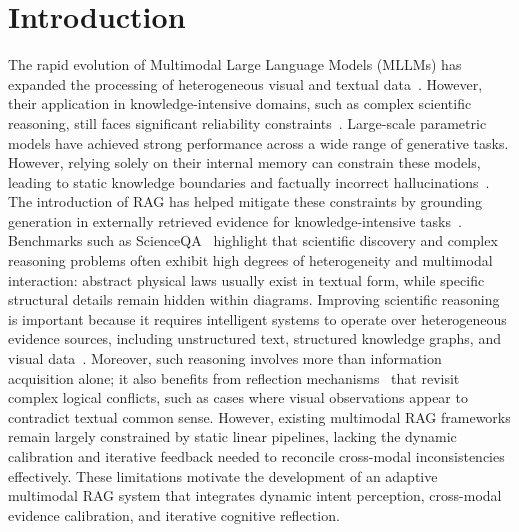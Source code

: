 \documentclass[a4paper, fleqn]{cas-dc}
\begin{document}
\maketitle

\section{Introduction}\label{sec:introduction}

The rapid evolution of Multimodal Large Language Models (MLLMs) has expanded the processing of heterogeneous visual and textual data~\cite{yin2024survey}.
However, their application in knowledge-intensive domains, such as complex scientific reasoning, still faces significant reliability constraints~\cite{alampara2025probing}.
Large-scale parametric models have achieved strong performance across a wide range of generative tasks. However, relying solely on their internal memory can constrain these models, leading to static knowledge boundaries and factually incorrect hallucinations~\cite{Lewis2020, Ji2023}.
The introduction of RAG has helped mitigate these constraints by grounding generation in externally retrieved evidence for knowledge-intensive tasks~\cite{Lewis2020, Guu2020, Gao2023}.
Benchmarks such as ScienceQA~\cite{Lu2022} highlight that scientific discovery and complex reasoning problems often exhibit high degrees of heterogeneity and multimodal interaction: abstract physical laws usually exist in textual form, while specific structural details remain hidden within diagrams.
Improving scientific reasoning is important because it requires intelligent systems to operate over heterogeneous evidence sources, including unstructured text, structured knowledge graphs, and visual data~\cite{Liu2025}.
Moreover, such reasoning involves more than information acquisition alone; it also benefits from reflection mechanisms~\cite{Shinn2023, Madaan2023} that revisit complex logical conflicts, such as cases where visual observations appear to contradict textual common sense.
However, existing multimodal RAG frameworks remain largely constrained by static linear pipelines, lacking the dynamic calibration and iterative feedback needed to reconcile cross-modal inconsistencies effectively.
These limitations motivate the development of an adaptive multimodal RAG system that integrates dynamic intent perception, cross-modal evidence calibration, and iterative cognitive reflection.
\end{document}
